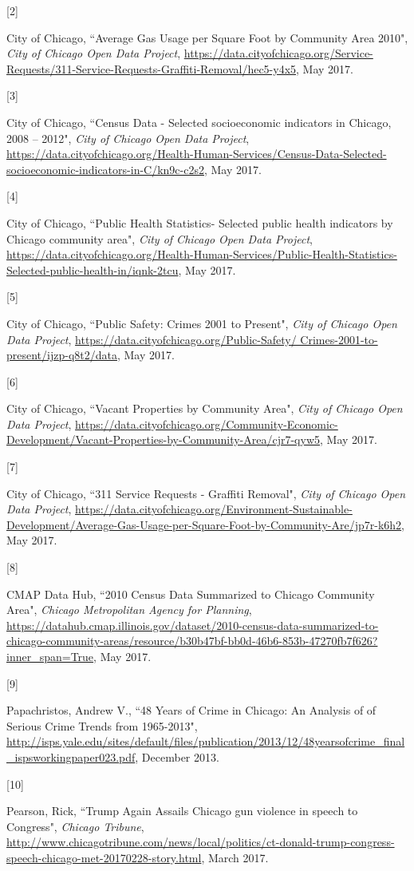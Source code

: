 \documentclass{article} %
\begin{document}
\hypertarget{Ref2}{[2]} City of Chicago, ``Average Gas Usage per Square Foot by Community Area 2010", \textit{City of Chicago Open Data Project}, \url{https://data.cityofchicago.org/Service-Requests/311-Service-Requests-Graffiti-Removal/hec5-y4x5}, May 2017.

\hypertarget{Ref3}{[3]} City of Chicago, ``Census Data - Selected socioeconomic indicators in Chicago, 2008 – 2012", \textit{City of Chicago Open Data Project}, \url{https://data.cityofchicago.org/Health-Human-Services/Census-Data-Selected-socioeconomic-indicators-in-C/kn9c-c2s2}, May 2017.

\hypertarget{Ref4}{[4]} City of Chicago, ``Public Health Statistics- Selected public health indicators by Chicago community area", \textit{City of Chicago Open Data Project}, \url{https://data.cityofchicago.org/Health-Human-Services/Public-Health-Statistics-Selected-public-health-in/iqnk-2tcu}, May 2017.

\hypertarget{Ref5}{[5]} City of Chicago, ``Public Safety: Crimes 2001 to Present", \textit{City of Chicago Open Data Project}, \url{https://data.cityofchicago.org/Public-Safety/ Crimes-2001-to-present/ijzp-q8t2/data}, May 2017.

\hypertarget{Ref6}{[6]} City of Chicago, ``Vacant Properties by Community Area", \textit{City of Chicago Open Data Project}, \url{https://data.cityofchicago.org/Community-Economic-Development/Vacant-Properties-by-Community-Area/cjr7-qyw5}, May 2017.

\hypertarget{Ref7}{[7]} City of Chicago, ``311 Service Requests - Graffiti Removal", \textit{City of Chicago Open Data Project}, \url{https://data.cityofchicago.org/Environment-Sustainable-Development/Average-Gas-Usage-per-Square-Foot-by-Community-Are/jp7r-k6h2}, May 2017.

\hypertarget{Ref8}{[8]} CMAP Data Hub, ``2010 Census Data Summarized to Chicago Community Area", \textit{Chicago Metropolitan Agency for Planning}, \url{https://datahub.cmap.illinois.gov/dataset/2010-census-data-summarized-to-chicago-community-areas/resource/b30b47bf-bb0d-46b6-853b-47270fb7f626?inner_span=True}, May 2017.

\hypertarget{Ref9}{[9]} Papachristos, Andrew V., ``48 Years of Crime in Chicago: An Analysis of of Serious Crime Trends from 1965-2013", \url{http://isps.yale.edu/sites/default/files/publication/2013/12/48yearsofcrime_final_ispsworkingpaper023.pdf}, December 2013.

\hypertarget{Ref10}{[10]} Pearson, Rick, ``Trump Again Assails Chicago gun violence in speech to Congress", \textit{Chicago Tribune}, \url{http://www.chicagotribune.com/news/local/politics/ct-donald-trump-congress-speech-chicago-met-20170228-story.html}, March 2017.
\end{document}
